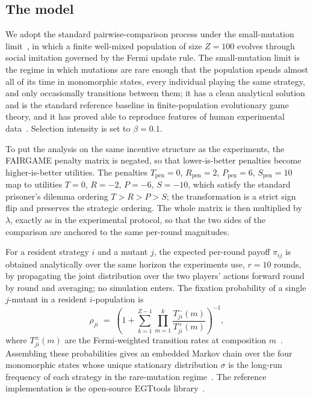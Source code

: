 \documentclass[openacc]{rsproca_new}
\newcommand{\lam}{\lambda}
\begin{document}
\subsection{The model}\label{appendix:egt_model}

We adopt the standard pairwise-comparison process under the small-mutation
limit~\cite{sigmund:2010bo,han_when_2021,nowak2004emergence,liu2020evolutionary},
in which a finite well-mixed population of size $Z = 100$ evolves through
social imitation governed by the Fermi update rule. The small-mutation limit is
the regime in which mutations are rare enough that the population spends almost
all of its time in monomorphic states, every individual playing the same
strategy, and only occasionally transitions between them; it has a clean
analytical solution and is the standard reference baseline in finite-population
evolutionary game theory, and it has proved able to reproduce features of human
experimental data~\cite{rand2013evolution,zisis2015generosity}. Selection
intensity is set to $\beta = 0.1$.

To put the analysis on the same incentive structure as the experiments, the
FAIRGAME penalty matrix is negated, so that lower-is-better penalties become
higher-is-better utilities. The penalties $T_{\text{pen}} = 0$,
$R_{\text{pen}} = 2$, $P_{\text{pen}} = 6$, $S_{\text{pen}} = 10$ map to
utilities $T = 0$, $R = -2$, $P = -6$, $S = -10$, which satisfy the standard
prisoner's dilemma ordering $T > R > P > S$; the transformation is a strict
sign flip and preserves the strategic ordering. The whole matrix is then
multiplied by $\lam$, exactly as in the experimental protocol, so that the two
sides of the comparison are anchored to the same per-round magnitudes.

For a resident strategy $i$ and a mutant $j$, the expected per-round payoff
$\pi_{ij}$ is obtained analytically over the same horizon the experiments use,
$r = 10$ rounds, by propagating the joint distribution over the two players'
actions forward round by round and averaging; no simulation enters. The
fixation probability of a single $j$-mutant in a resident $i$-population is
\begin{equation}
\rho_{ji} \;=\; \left(1 + \sum_{k=1}^{Z-1}\prod_{m=1}^{k}
   \frac{T^{-}_{ji}(m)}{T^{+}_{ji}(m)}\right)^{-1},
\label{eq:fixation}
\end{equation}
where $T^{\pm}_{ji}(m)$ are the Fermi-weighted transition rates at composition
$m$~\cite{szabo1998evolutionary}. Assembling these probabilities gives an
embedded Markov chain over the four monomorphic states whose unique stationary
distribution $\sigma$ is the long-run frequency of each strategy in the
rare-mutation regime~\cite{sigmund:2010bo}. The reference implementation is
the open-source EGTtools library~\cite{domingos2023egttools}.
\end{document}

